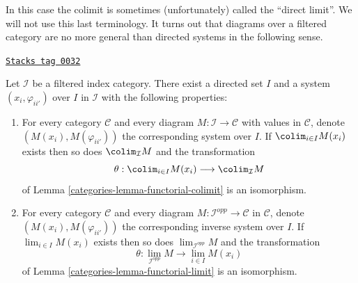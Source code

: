 In this case the colimit is sometimes (unfortunately)
called the ``direct limit''. We will not use this last
terminology. It turns out that diagrams over a filtered
category are no more general than directed systems in the
following sense.

\begin{lemma}
\label{categories-lemma-directed-category-system}
\href{https://stacks.math.columbia.edu/tag/0032}{\texttt{Stacks tag 0032}}

Let $\mathcal{I}$ be a filtered index category.
There exist a directed set $I$
and a system $(x_i, \varphi_{ii'})$ over $I$ in $\mathcal{I}$
with the following properties:
\begin{enumerate}
\item For every category $\mathcal{C}$ and every diagram
$M : \mathcal{I} \to \mathcal{C}$ with values in $\mathcal{C}$,
denote $(M(x_i), M(\varphi_{ii'}))$
the corresponding system over $I$. If
$\colim_{i \in I} M(x_i)$ exists then so does
$\colim_\mathcal{I} M$ and the transformation
$$
\theta :
\colim_{i \in I} M(x_i)
\longrightarrow
\colim_\mathcal{I} M
$$
of Lemma \ref{categories-lemma-functorial-colimit} is an isomorphism.
\item For every category $\mathcal{C}$ and every diagram
$M : \mathcal{I}^{opp} \to \mathcal{C}$ in $\mathcal{C}$, denote
$(M(x_i), M(\varphi_{ii'}))$ the corresponding inverse system
over $I$. If $\lim_{i \in I} M(x_i)$ exists then so does
$\lim_{\mathcal{I}^{opp}} M$ and the transformation
$$
\theta :
\lim_{\mathcal{I}^{opp}} M
\longrightarrow
\lim_{i \in I} M(x_i)
$$
of Lemma \ref{categories-lemma-functorial-limit} is an isomorphism.
\end{enumerate}
\end{lemma}

